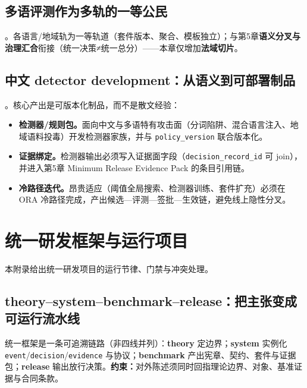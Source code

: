 \documentclass[11pt,a4paper]{report}
\begin{document}
\section{多语评测作为多轨的一等公民}
\EvalFramework{}。各语言/地域轨为一等轨道（套件版本、聚合、模板独立）；与第5章\textbf{语义分叉与治理汇合}衔接（统一决策≠统一总分）——本章仅增加\textbf{法域切片}。

\section{中文 detector development：从语义到可部署制品}
\ControlPlane{}。核心产出是可版本化制品，而不是散文经验：
\begin{itemize}
  \item \textbf{检测器/规则包。}面向中文与多语特有攻击面（分词陷阱、混合语言注入、地域语料投毒）开发检测器家族，并与 \texttt{policy\_version} 联合版本化。
  \item \textbf{证据绑定。}检测器输出必须写入证据面字段（\texttt{decision\_record\_id} 可 join），并进入第5章 Minimum Release Evidence Pack 的条目引用链。
  \item \textbf{冷路径迭代。}昂贵适应（阈值全局搜索、检测器训练、套件扩充）必须在 ORA 冷路径完成，产出候选—评测—签批—生效链，避免线上隐性分叉。
\end{itemize}


\appendix

\chapter{统一研发框架与运行项目}\label{app:rd-framework}
本附录给出统一研发项目的运行节律、门禁与冲突处理。

\section{theory--system--benchmark--release：把主张变成可运行流水线}
统一框架是一条可追溯链路（非四线并列）：\textbf{theory} 定边界；\textbf{system} 实例化 \texttt{event}/\texttt{decision}/\texttt{evidence} 与协议；\textbf{benchmark} 产出宪章、契约、套件与证据包；\textbf{release} 输出放行决策。\textbf{约束：}对外陈述须同时回指理论边界、对象、基准证据与合同条款。
\end{document}
